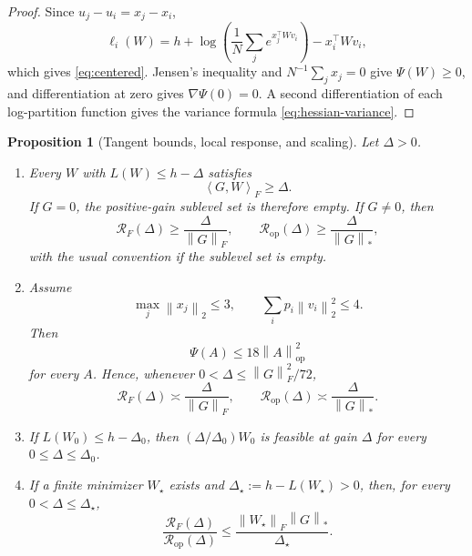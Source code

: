 \documentclass[11pt]{article}
\newtheorem{proposition}[proposition]{Proposition}
\theoremstyle{definition}
\newcommand{\ip}[2]{\left\langle #1,#2\right\rangle_F}
\newcommand{\norm}[1]{\left\lVert #1\right\rVert_2}
\newcommand{\normF}[1]{\left\lVert #1\right\rVert_F}
\newcommand{\normop}[1]{\left\lVert #1\right\rVert_{\mathrm{op}}}
\newcommand{\normnuc}[1]{\left\lVert #1\right\rVert_*}
\begin{document}
\begin{proof}
Since $u_j-u_i=x_j-x_i$,
\[
 \ell_i(W)=h+
 \log\left(\frac1N\sum_j e^{x_j^\top Wv_i}\right)
 -x_i^\top Wv_i,
\]
which gives \eqref{eq:centered}.  Jensen's inequality and
$N^{-1}\sum_jx_j=0$ give $\Psi(W)\geq0$, and differentiation at zero
gives $\nabla\Psi(0)=0$.  A second differentiation of each
log-partition function gives the variance formula
\eqref{eq:hessian-variance}.
\end{proof}

\begin{proposition}[Tangent bounds, local response, and scaling]
\label{prop:convex-geometry}
Let $\Delta>0$.
\begin{enumerate}[label=\textup{(\roman*)}]
\item Every $W$ with $L(W)\leq h-\Delta$ satisfies
\[
 \ip{G}{W}\geq\Delta.
\]
If $G=0$, the positive-gain sublevel set is therefore empty.  If
$G\neq0$, then
\begin{equation}
 \mathcal R_F(\Delta)\geq\frac{\Delta}{\normF{G}},
 \qquad
 \mathcal R_{\mathrm{op}}(\Delta)\geq
 \frac{\Delta}{\normnuc{G}},
 \label{eq:tangent}
\end{equation}
with the usual convention if the sublevel set is empty.
\item Assume
\begin{equation}
 \max_j\norm{x_j}\leq3,
 \qquad
 \sum_i p_i\norm{v_i}^2\leq4.
 \label{eq:deterministic-regularity}
\end{equation}
Then
\begin{equation}
 \Psi(A)\leq18\normop{A}^2
 \label{eq:global-psi}
\end{equation}
for every $A$.  Hence, whenever
$0<\Delta\leq\normF{G}^2/72$,
\begin{equation}
 \mathcal R_F(\Delta)\asymp\frac{\Delta}{\normF{G}},
 \qquad
 \mathcal R_{\mathrm{op}}(\Delta)
 \asymp\frac{\Delta}{\normnuc{G}}.
 \label{eq:local-radii}
\end{equation}
\item If $L(W_0)\leq h-\Delta_0$, then
$(\Delta/\Delta_0)W_0$ is feasible at gain $\Delta$ for every
$0\leq\Delta\leq\Delta_0$.
\item If a finite minimizer $W_\star$ exists and
$\Delta_\star:=h-L(W_\star)>0$, then, for every
$0<\Delta\leq\Delta_\star$,
\begin{equation}
 \frac{\mathcal R_F(\Delta)}
 {\mathcal R_{\mathrm{op}}(\Delta)}
 \leq
 \frac{\normF{W_\star}\normnuc{G}}{\Delta_\star}.
 \label{eq:all-accuracy}
\end{equation}
\end{enumerate}
\end{proposition}
\end{document}
